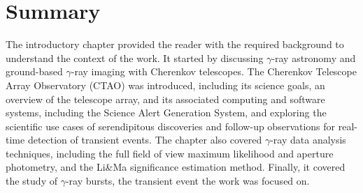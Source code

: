 \section{Summary}
The introductory chapter provided the reader with the required background to understand the context of the work. It started by discussing $\gamma$-ray astronomy and ground-based $\gamma$-ray imaging with Cherenkov telescopes. The Cherenkov Telescope Array Observatory (CTAO) was introduced, including its science goals, an overview of the telescope array, and its associated computing and software systems, including the Science Alert Generation System, and exploring the scientific use cases of serendipitous discoveries and follow-up observations for real-time detection of transient events. The chapter also covered $\gamma$-ray data analysis techniques, including the full field of view maximum likelihood and aperture photometry, and the Li&Ma significance estimation method. Finally, it covered the study of $\gamma$-ray bursts, the transient event the work was focused on.